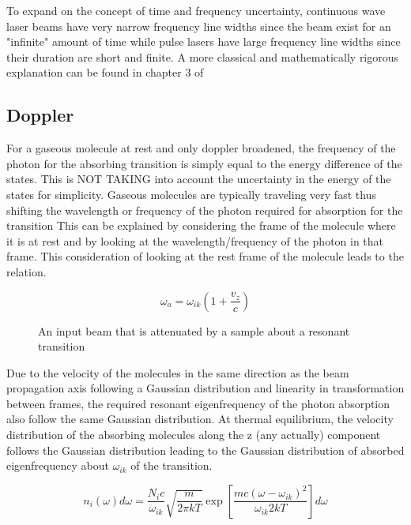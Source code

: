 \documentclass[a4paper]{book}
\newcommand{\imginput}[1]{} %
\begin{document}
To expand on the concept of time and frequency uncertainty, continuous wave laser beams have very narrow frequency line widths since the beam exist for an "infinite" amount of time while pulse lasers have large frequency line widths since their duration are short and finite. A more classical and mathematically rigorous explanation can be found in chapter 3 of \cite{LaserSpec1}

\subsection{Doppler}
\label{subsec:Doppler}
For a gaseous molecule at rest and only doppler broadened, the frequency of the photon for the absorbing transition is simply equal to the energy difference of the states. 
This is NOT TAKING into account the uncertainty in the energy of the states for simplicity.
Gaseous molecules are typically traveling very fast thus shifting the wavelength or frequency of the photon required for absorption for the transition
This can be explained by considering the frame of the molecule where it is at rest and by looking at the wavelength/frequency of the photon in that frame. 
This consideration of looking at the rest frame of the molecule leads to the relation.

\begin{equation}
\label{eq:frequencyInNewRestFrame}
\omega_a =\omega_{ik} \left(1+\dfrac{v_z}{c} \right)
\end{equation}

\begin{figure} [!ht]
	\centering
	\def\svgwidth{\columnwidth}
	\resizebox{150mm}{!}{\imginput{images/dop-broad.pdf_tex}}
	\label{fig:dop-broad}
	\caption{An input beam that is attenuated by a sample about a resonant transition}
\end{figure}	

Due to the velocity of the molecules in the same direction as the beam propagation axis following a Gaussian distribution and linearity in transformation between frames, the required resonant eigenfrequency of the photon absorption also follow the same Gaussian distribution. 
At thermal equilibrium, the velocity distribution of the absorbing molecules along the z (any actually) component follows the Gaussian distribution
leading to the Gaussian distribution of absorbed eigenfrequency about $\omega_{ik}$ of the transition.

\begin{equation}
\label{eq:EigenFrequencyGaussianDistribution}
n_i(\omega)d\omega = \dfrac{N_i c}{\omega_{ik}} \sqrt{\dfrac{m}{2 \pi k T }} \exp{\left[\frac{m c (\omega-\omega_{ik})^2}{\omega_{ik} 2kT}\right]} d\omega
\end{equation}
\end{document}

